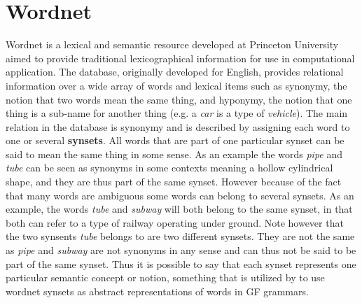 
\section{Wordnet}
Wordnet \citep{miller1995wordnet} is a lexical and semantic resource developed at Princeton University aimed to provide traditional lexicographical information for use in computational application. The database, originally developed for English, provides relational information over a wide array of words and lexical items such as synonymy, the notion that two words mean the same thing, and hyponymy, the notion that one thing is a sub-name for another thing (e.g. a \emph{car} is a type of \emph{vehicle}). The main relation in the database is synonymy and is described by assigning each word to one or several \textbf{synsets}. All words that are part of one particular synset can be said to mean the same thing in some sense. As an example the words \emph{pipe} and \emph{tube} can be seen as synonyms in some contexts meaning a hollow cylindrical shape, and they are thus part of the same synset. However because of the fact that many words are ambiguous some words can belong to several synsets. As an example, the words \emph{tube} and \emph{subway} will both belong to the same synset, in that both can refer to a type of railway operating under ground. Note however that the two synsents \emph{tube} belongs to are two different synsets. They are not the same as \emph{pipe} and \emph{subway} are not synonyms in any sense and can thus not be said to be part of the same synset. Thus it is possible to say that each synset represents one particular semantic concept or notion, something that is utilized by \citep{virk2014developing} to use wordnet synsets as abstract representations of words in GF grammars.

